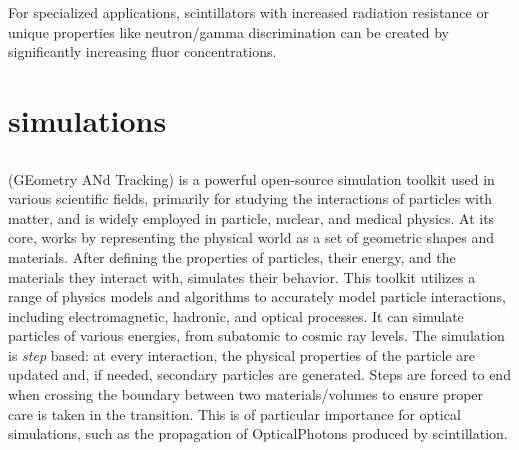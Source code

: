 \begin{refsection}
        For specialized applications, scintillators with increased radiation resistance or unique properties like neutron/gamma discrimination can be created by significantly increasing fluor concentrations.
        
\section{\gf simulations}
    \label{sec:muEDM:entrance:sim}
    \subsection{\gf}
        \gf (GEometry ANd Tracking) is a powerful open-source simulation toolkit used in various scientific fields, primarily for studying the interactions of particles with matter, and is widely employed in particle, nuclear, and medical physics. 
        At its core, \gf works by representing the physical world as a set of geometric shapes and materials. 
        After defining the properties of particles, their energy, and the materials they interact with, \gf simulates their behavior. 
        This toolkit utilizes a range of physics models and algorithms to accurately model particle interactions, including electromagnetic, hadronic, and optical processes. It can simulate particles of various energies, from subatomic to cosmic ray levels.
        The simulation is \textit{step} based: at every interaction, the physical properties of the particle are updated and, if needed, secondary particles are generated. 
        Steps are forced to end when crossing the boundary between two materials/volumes to ensure proper care is taken in the transition. 
        This is of particular importance for optical simulations, such as the propagation of OpticalPhotons produced by scintillation.


\end{refsection}
